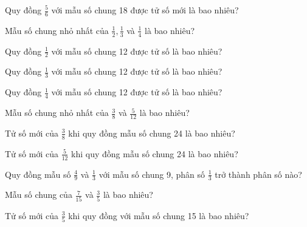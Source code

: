 \begin{ex}
Quy đồng $\frac{5}{6}$ với mẫu số chung 18 được tử số mới là bao nhiêu?
\end{ex}

\begin{ex}
Mẫu số chung nhỏ nhất của $\frac{1}{2}, \frac{1}{3}$ và $\frac{1}{4}$ là bao nhiêu?
\end{ex}

\begin{ex}
Quy đồng $\frac{1}{2}$ với mẫu số chung 12 được tử số là bao nhiêu?
\end{ex}

\begin{ex}
Quy đồng $\frac{1}{3}$ với mẫu số chung 12 được tử số là bao nhiêu?
\end{ex}

\begin{ex}
Quy đồng $\frac{1}{4}$ với mẫu số chung 12 được tử số là bao nhiêu?
\end{ex}

\begin{ex}
Mẫu số chung nhỏ nhất của $\frac{3}{8}$ và $\frac{5}{12}$ là bao nhiêu?
\end{ex}

\begin{ex}
Tử số mới của $\frac{3}{8}$ khi quy đồng mẫu số chung 24 là bao nhiêu?
\end{ex}

\begin{ex}
Tử số mới của $\frac{5}{12}$ khi quy đồng mẫu số chung 24 là bao nhiêu?
\end{ex}

\begin{ex}
Quy đồng mẫu số $\frac{4}{9}$ và $\frac{1}{3}$ với mẫu số chung 9, phân số $\frac{1}{3}$ trở thành phân số nào?
\end{ex}

\begin{ex}
Mẫu số chung của $\frac{7}{15}$ và $\frac{3}{5}$ là bao nhiêu?
\end{ex}

\begin{ex}
Tử số mới của $\frac{3}{5}$ khi quy đồng với mẫu số chung 15 là bao nhiêu?
\end{ex}

